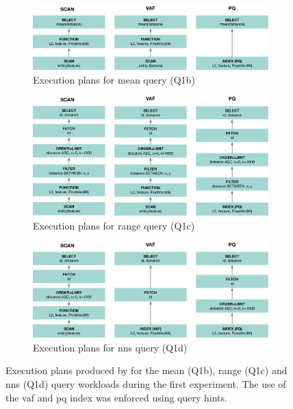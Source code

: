 \begin{figure}[p]
    \centering
    \begin{subfigure}[b]{\textwidth}
        \centering
        \includegraphics[width=\textwidth]{figures/analytics/query-plan-mean}
        \caption{Execution plans for mean query (Q1b)}
        \label{figure:cottontail_analytics_mean}
    \end{subfigure}
    \hfill
    \centering
    \begin{subfigure}[b]{\textwidth}
        \centering
        \includegraphics[width=\textwidth]{figures/analytics/query-plan-range}
        \caption{Execution plans for range query (Q1c)}
        \label{figure:cottontail_analytics_range}
    \end{subfigure}
    \hfill
    \centering
    \begin{subfigure}[b]{\textwidth}
        \centering
        \includegraphics[width=\textwidth]{figures/analytics/query-plan-nns}
        \caption{Execution plans for \acrshort{nns} query (Q1d)}
        \label{figure:cottontail_analytics_nns}
    \end{subfigure}
    \caption{Execution plans produced by \cottontail{} for the mean (Q1b), range (Q1c) and \acrshort{nns} (Q1d) query workloads during the first experiment. The use of the \acrshort{vaf} and \acrshort{pq} index was enforced using query hints.}
    \label{figure:cottontail_analytics_plans}
\end{figure}

